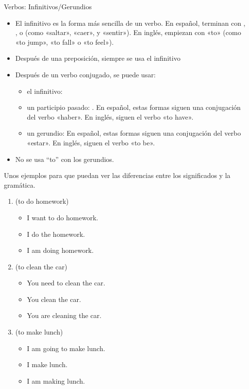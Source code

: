 \begin{conf}{Verbos: Infinitivos/Gerundios}
	\begin{itemize}
		\item El infinitivo es la forma más sencilla de un verbo.
			En español, terminan con , , o 
			(como «saltar», «caer», y «sentir»). En inglés, empiezan con «to»
			(como «to jump», «to fall» o «to feel»).
		\item Después de una preposición, siempre se usa el infinitivo
		\item Después de un verbo conjugado, se puede usar:
			\begin{itemize}
				\item el infinitivo:  \arr {}
				\item un participio pasado:  \arr {}.
					En español, estas formas siguen una conjugación del verbo «haber».
					En inglés, siguen el verbo «to have».
				\item un gerundio:  \arr {}
					En español, estas formas siguen una conjugación del verbo «estar».
					En inglés, siguen el verbo «to be».
			\end{itemize}
		\item No se usa ``to'' con los gerundios.
	\end{itemize}
\end{conf}

Unos ejemplos para que puedan ver las diferencias entre los significados y la gramática.
\begin{enumerate}
	\item {} (to do homework)
		\begin{itemize}
			\item {} \arr I want to do homework.
			\item {} \arr I do the homework.
			\item {} \arr I am doing homework.
		\end{itemize}
	\item {} (to clean the car)
		\begin{itemize}
			\item {} \arr You need to clean the car.
			\item {} \arr You clean the car.
			\item {} \arr You are cleaning the car.
		\end{itemize}
	\item {} (to make lunch)
		\begin{itemize}
			\item {} \arr I am going to make lunch.
			\item {} \arr I make lunch.
			\item {} \arr I am making lunch.
		\end{itemize}
\end{enumerate}

